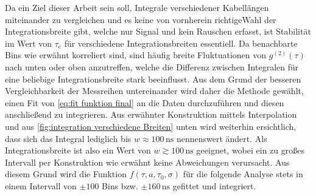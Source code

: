 Da ein Ziel dieser Arbeit sein soll, Integrale verschiedener Kabellängen miteinander zu vergleichen und es keine von vornherein \glqq richtige\grqq\;Wahl der Integrationsbreite gibt, welche nur Signal und kein Rauschen erfasst, ist Stabilität im Wert von $\tau_{\mathrm{c}}$ für verschiedene Integrationsbreiten essentiell. 
Da benachbarte Bins wie erwähnt korreliert sind, sind häufig breite Fluktuationen von $g^{(2)}(\tau)$ nach unten oder oben anzutreffen, welche die Differenz zwischen Integralen für eine beliebige Integrationsbreite stark beeinflusst. 
Aus dem Grund der besseren Vergleichbarkeit der Messreihen untereinander wird daher die Methode gewählt, einen Fit von \autoref{eq:fit funktion final} an die Daten durchzuführen und diesen anschließend zu integrieren. 
Aus erwähnter Konstruktion mittels Interpolation und aus \autoref{fig:integration verschiedene Breiten} unten wird weiterhin ersichtlich, dass sich das Integral lediglich bis $w\approx 100\,\mathrm{ns}$ nennenswert ändert. 
Als Integrationsbreite ist also ein Wert von $w\gtrsim 100\,\mathrm{ns}$ geeignet, wobei ein zu großes Intervall per Konstruktion wie erwähnt keine Abweichungen verursacht. 
Aus diesem Grund wird die Funktion $f(\tau, a, \tau_0, \sigma)$ für die folgende Analyse stets in einem Intervall von $\pm 100$ Bins bzw. $\pm 160\,\mathrm{ns}$ gefittet und integriert. 
